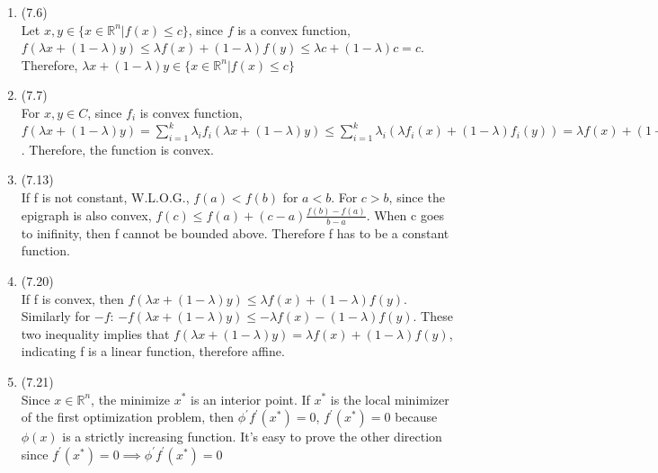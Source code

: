 \documentclass[letterpaper,12pt]{article}
\theoremstyle{definition}
\begin{document}
\begin{enumerate}
	\item(7.6)\\
	Let $x, y \in \{ x \in \mathbb{R}^{n}| f(x) \leq c\}$, since $f$ is a convex function, $f(\lambda x + (1 - \lambda) y) \leq \lambda f(x) + (1 - \lambda) f(y) \leq \lambda c + (1 - \lambda) c = c$. Therefore, $\lambda x + (1 - \lambda) y \in \{ x \in \mathbb{R}^{n}| f(x) \leq c\} $\\

	\item(7.7)\\
	For $x, y \in C$, since $f_{i}$ is convex function, $f(\lambda x + (1 - \lambda) y) = \sum_{i =  1}^{k}\lambda_{i}f_{i}(\lambda x + (1 - \lambda) y) \leq  \sum_{i =  1}^{k}\lambda_{i}(\lambda f_{i}(x) + (1 - \lambda)f_{i}(y)) = \lambda f(x) + (1 - \lambda) f(y)$. Therefore, the function is convex.\\

	\item(7.13)\\
	If f is not constant, W.L.O.G., $f(a) < f(b)$ for $a < b$. For $c > b$, since the epigraph is also convex, $f(c) \leq f(a) + (c - a)\frac{f(b) - f(a)}{b - a}$. When c goes to inifinity, then f cannot be bounded above. Therefore f has to be a constant function.\\

	\item(7.20)\\
	If f is convex, then $f(\lambda x + (1 - \lambda)y) \leq \lambda f(x) + (1 - \lambda)f(y)$. Similarly for $-f$: $-f(\lambda x + (1 - \lambda)y) \leq -\lambda f(x) - (1 - \lambda)f(y)$. These two inequality implies that $f(\lambda x + (1 - \lambda)y) = \lambda f(x) + (1 - \lambda)f(y)$, indicating f is a linear function, therefore affine.\\
	
	\item(7.21)\\
	Since $x \in \mathbb{R}^{n}$, the minimize $x^{*}$ is an interior point. If $x^{*}$ is the local minimizer of the first optimization problem, then $\phi^{'}f^{'}(x^{*}) = 0$, $f^{'}(x^{*}) = 0$ because $\phi (x)$ is a strictly increasing function. It's easy to prove the other direction since $f^{'}(x^{*}) = 0 \implies \phi^{'}f^{'}(x^{*}) = 0$\\
	

\end{enumerate}

\vspace{25mm}
\end{document}
